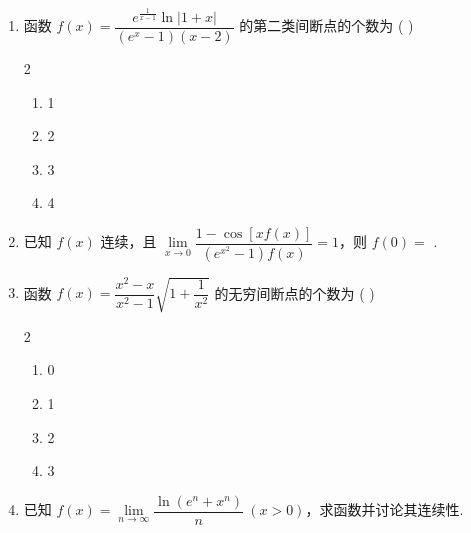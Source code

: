 \newpage

\begin{enumerate}[label=\textbf{\arabic*.}, itemsep=4.5cm, resume]
    \item 函数 $f(x) = \dfrac{e^{\frac{1}{x-1}} \ln |1+x|}{(e^x - 1)(x-2)}$ 的第二类间断点的个数为 ( \quad )
    \begin{multicols}{2}
    \begin{enumerate}[label=(\Alph*)]
        \item 1
        \item 2
        \item 3
        \item 4
    \end{enumerate}
    \end{multicols}

    \item 已知 $f(x)$ 连续，且 $\lim\limits_{x \to 0} \dfrac{1 - \cos[xf(x)]}{(e^{x^2} - 1)f(x)} = 1$，则 $f(0) =$ \underline{\hspace{2cm}}.

    \item 函数 $f(x) = \dfrac{x^2 - x}{x^2 - 1} \sqrt{1 + \dfrac{1}{x^2}}$ 的无穷间断点的个数为 ( \quad )
    \begin{multicols}{2}
    \begin{enumerate}[label=(\Alph*)]
        \item 0
        \item 1
        \item 2
        \item 3
    \end{enumerate}
    \end{multicols}

    \item 已知 $f(x) = \lim\limits_{n \to \infty} \dfrac{\ln(e^n + x^n)}{n} \ (x > 0)$，求函数并讨论其连续性.
\end{enumerate}

\newpage

